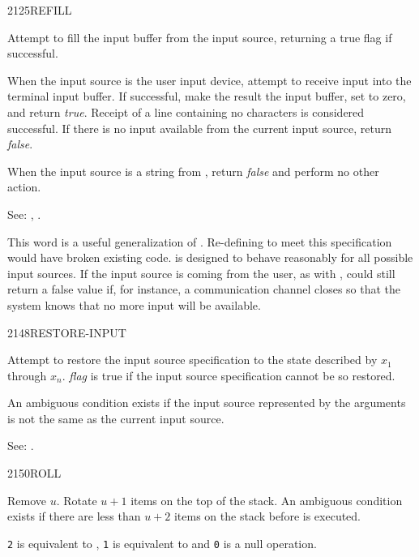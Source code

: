 \begin{newword}{2125}{REFILL}

	Attempt to fill the input buffer from the input source,
	returning a true flag if successful.

	When the input source is the user input device, attempt to
	receive input into the terminal input buffer. If successful,
	make the result the input buffer, set  to zero, and
	return \emph{true}. Receipt of a line containing no characters
	is considered successful. If there is no input available from
	the current input source, return \emph{false}.

	When the input source is a string from , return
	\emph{false} and perform no other action.

\item[See:]
	,
	.

	\begin{rationale} %
		This word is a useful generalization of .
		Re-defining  to meet this specification would
		have broken existing code.  is designed to behave
		reasonably for all possible input sources. If the input source
		is coming from the user, as with , 
		could still return a false value if, for instance, a
		communication channel closes so that the system knows that no
		more input will be available.
	\end{rationale}
\end{newword}


\begin{newword}{2148}{RESTORE-INPUT}

	Attempt to restore the input source specification to the state
	described by $x_1$ through $x_n$. \emph{flag} is true if the
	input source specification cannot be so restored.

	An ambiguous condition exists if the input source represented
	by the arguments is not the same as the current input source.

\item[See:]
	.
\end{newword}


\begin{newword}{2150}{ROLL}

	Remove $u$. Rotate $u+1$ items on the top of the stack. An
	ambiguous condition exists if there are less than $u+2$ items
	on the stack before  is executed.

	\begin{rationale} %
		\texttt{2}  is equivalent to ,
		\texttt{1}  is equivalent to  and
		\texttt{0}  is a null operation.
	\end{rationale}
\end{newword}


